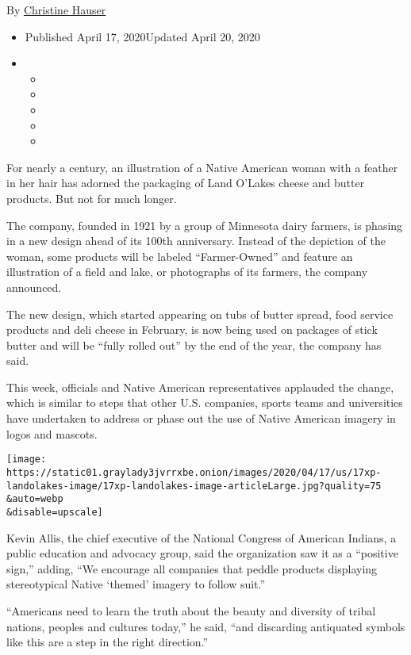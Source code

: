 By
\href{https://www.nytimes3xbfgragh.onion/by/christine-hauser}{Christine
Hauser}

\begin{itemize}
\item
  Published April 17, 2020Updated April 20, 2020
\item
  \begin{itemize}
  \item
  \item
  \item
  \item
  \item
  \end{itemize}
\end{itemize}

For nearly a century, an illustration of a Native American woman with a
feather in her hair has adorned the packaging of Land O'Lakes cheese and
butter products. But not for much longer.

The company, founded in 1921 by a group of Minnesota dairy farmers, is
phasing in a new design ahead of its 100th anniversary. Instead of the
depiction of the woman, some products will be labeled ``Farmer-Owned''
and feature an illustration of a field and lake, or photographs of its
farmers, the company announced.

The new design, which started appearing on tubs of butter spread, food
service products and deli cheese in February, is now being used on
packages of stick butter and will be ``fully rolled out'' by the end of
the year, the company has said.

This week, officials and Native American representatives applauded the
change, which is similar to steps that other U.S. companies, sports
teams and universities have undertaken to address or phase out the use
of Native American imagery in logos and mascots.

\texttt{[image: https://static01.graylady3jvrrxbe.onion/images/2020/04/17/us/17xp-landolakes-image/17xp-landolakes-image-articleLarge.jpg?quality=75\\\&auto=webp\\\&disable=upscale]}

Kevin Allis, the chief executive of the National Congress of American
Indians, a public education and advocacy group, said the organization
saw it as a ``positive sign,'' adding, ``We encourage all companies that
peddle products displaying stereotypical Native `themed' imagery to
follow suit.''

``Americans need to learn the truth about the beauty and diversity of
tribal nations, peoples and cultures today,'' he said, ``and discarding
antiquated symbols like this are a step in the right direction.''

